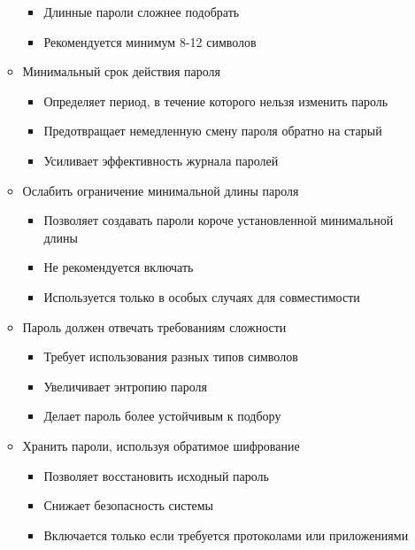 \documentclass[a4paper, 14pt]{report}
\begin{document}
\begin{enumerate}
\begin{itemize}
\begin{itemize}
                        \item Длинные пароли сложнее подобрать
                        \item Рекомендуется минимум 8-12 символов
                    \end{itemize}
              \item Минимальный срок действия пароля
                    \begin{itemize}
                        \item Определяет период, в течение которого нельзя изменить пароль
                        \item Предотвращает немедленную смену пароля обратно на старый
                        \item Усиливает эффективность журнала паролей
                    \end{itemize}
              \item Ослабить ограничение минимальной длины пароля
                    \begin{itemize}
                        \item Позволяет создавать пароли короче установленной минимальной длины
                        \item Не рекомендуется включать
                        \item Используется только в особых случаях для совместимости
                    \end{itemize}
              \item Пароль должен отвечать требованиям сложности
                    \begin{itemize}
                        \item Требует использования разных типов символов
                        \item Увеличивает энтропию пароля
                        \item Делает пароль более устойчивым к подбору
                    \end{itemize}
              \item Хранить пароли, используя обратимое шифрование
                    \begin{itemize}
                        \item Позволяет восстановить исходный пароль
                        \item Снижает безопасность системы
                        \item Включается только если требуется протоколами или приложениями

\end{itemize}
\end{itemize}
\end{enumerate}
\end{document}
